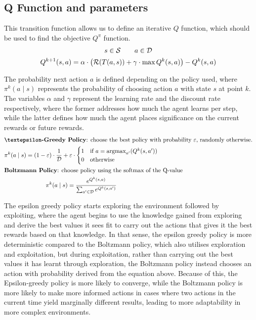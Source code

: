 \subsection{Q Function and parameters}

This transition function allows us to define an iterative $Q$ function, which should be used to find the objective $Q^\pi$ function.
\begin{gather*}
	s \in \mathcal{S} \qquad a \in \mathcal{D} \\
	Q^{k + 1}(s, a) = \alpha \cdot \left( \mathcal{R}( T( a, s ) ) + \gamma \cdot \max{Q^k(s, a)} \right) - Q^k(s, a)
\end{gather*}

The probability next action $a$ is defined depending on the policy used, where $\pi^k(a \mid s)$ represents the probability of choosing action $a$ with state $s$ at point $k$. The variables $\alpha$ and $\gamma$ represent the learning rate and the discount rate respectively, where the former addresses how much the agent learns per step, while the latter defines how much the agent places significance on the current rewards or future rewards.
\begin{gather*}
	\intertext{\textbf{\textepsilon-Greedy Policy}: choose the best policy with probability $\varepsilon$, randomly otherwise.}
	\pi^k(a \mid s) = 
		(1 - \varepsilon) \cdot \frac{1}{\mathcal{D}} + \varepsilon \cdot \begin{cases}
			1 & \text{if } a = \argmax_{a'} (Q^k(s, a')) \\
			0 & \text{otherwise}
		\end{cases} \\
	\intertext{\textbf{Boltzmann Policy}: choose policy using the softmax of the Q-value}
	\pi^k(a \mid s) = \frac{e^{Q^k(s, a)}}{\sum_{a' \in \mathcal{D}}{e^{Q^k(s, a')}}}
\end{gather*}

The epsilon greedy policy starts exploring the environment followed by exploiting, where the agent begins to use the knowledge gained from exploring and derive the best values it sees fit to carry out the actions that gives it the best rewards based on that knowledge. In that sense, the epsilon greedy policy is more deterministic compared to the Boltzmann policy, which also utilises exploration and exploitation, but during exploitation, rather than carrying out the best values it has learnt through exploration, the Boltzmann policy instead chooses an action with probability derived from the equation above. Because of this, the Epsilon-greedy policy is more likely to converge, while the Boltzmann policy is more likely to make more informed actions in cases where two actions in the current time yield marginally different results, leading to more adaptability in more complex environments.

